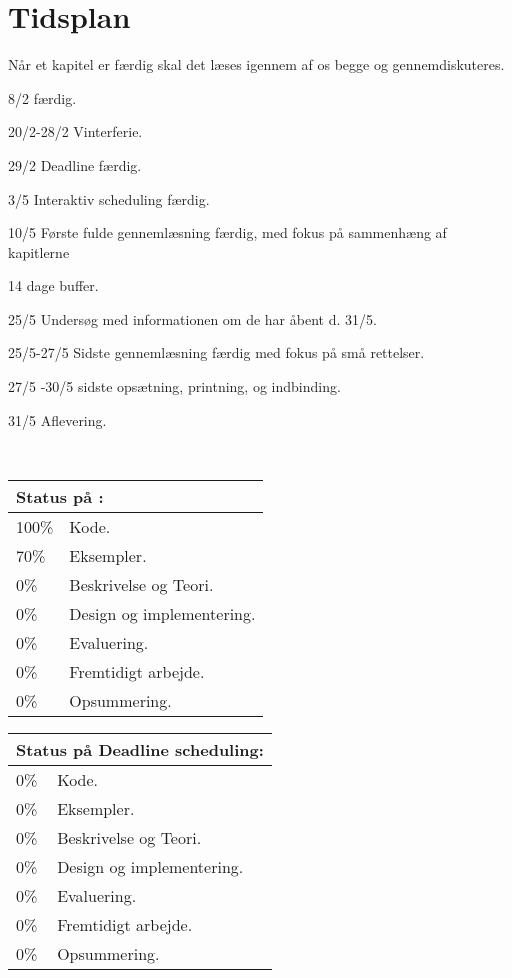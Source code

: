 \chapter{Tidsplan}
Når et kapitel er færdig skal det læses igennem af os begge og gennemdiskuteres.
\begin{list}{}{}
\tightlist 
\item [8/2] \des færdig.
\item [20/2-28/2] Vinterferie.
\item [29/2] Deadline færdig.
\item [3/5] Interaktiv scheduling færdig.
\item [10/5] Første fulde gennemlæsning færdig, med fokus på sammenhæng af kapitlerne
\item [14 dage buffer.]
\item[25/5] Undersøg med informationen om de har åbent d. 31/5.
\item [25/5-27/5] Sidste gennemlæsning færdig med fokus på små rettelser.
\item [27/5 -30/5] sidste opsætning, printning, og indbinding.
\item [31/5] Aflevering.
\end{list}\
\begin{tabular}{m{0.5cm}m{4cm}}
\hline  
\multicolumn{2}{m{4.5cm}}{\textbf{Status på \des:}} \\
\hline
100\% & Kode.  \\ 
70\% & Eksempler.\\
0\% & Beskrivelse og Teori.\\
0\% & Design og  implementering. \\
0\% & Evaluering. \\
0\% & Fremtidigt arbejde. \\
0\% & Opsummering. \\ 
\hline
\end{tabular}
\quad
\begin{tabular}{m{0.5cm}m{4cm}}
\hline  
\multicolumn{2}{m{4.5cm}}{\textbf{Status på Deadline scheduling:}} \\
\hline
0\% & Kode.  \\ 
0\% & Eksempler.\\
0\% & Beskrivelse og Teori.\\
0\% & Design og  implementering. \\
0\% & Evaluering. \\
0\% & Fremtidigt arbejde. \\
0\% & Opsummering. \\ 
\hline
\end{tabular}\\
